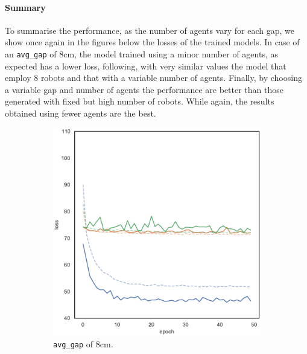 \paragraph*{Summary}
To summarise the performance, as the number of agents vary for each gap, we 
show once again in the figures below the losses of the trained models.
In case of an \texttt{avg\_gap} of $8$\gls{cm}, the model trained using 
a minor number of agents, as expected has a lower loss, following, with very 
similar values the model that employ 8 robots and that with a variable number of 
agents.
Finally, by choosing a variable gap and number of agents the performance are 
better than those generated with fixed but high number of robots. While again, 
the results obtained using fewer agents are the best.
\begin{figure}[!htb]
	\centering
	\begin{subfigure}[h]{0.3\textwidth}
		\centering
		\includegraphics[width=\textwidth]{contents/images/task1-extension/loss-distributed-gap_8@copy}%
		\caption{\texttt{avg\_gap} of $8$\gls{cm}.}
	\end{subfigure}
	\hfill
	\begin{subfigure}[h]{0.3\textwidth}
		\centering

\end{subfigure}
\end{figure}
